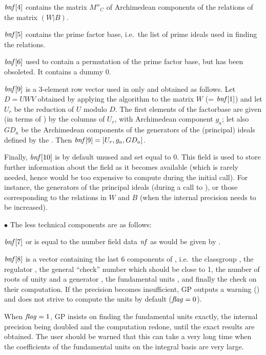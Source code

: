 $\hbox{\it bnf\/}[4]$ contains the matrix $M''_C$ of Archimedean components of the
relations of the matrix $(W|B)$.

$\hbox{\it bnf\/}[5]$ contains the prime factor base, i.e.~the list of prime
ideals used in finding the relations.

$\hbox{\it bnf\/}[6]$ used to contain a permutation of the prime factor base, but
has been obsoleted. It contains a dummy $0$.

$\hbox{\it bnf\/}[9]$ is a 3-element row vector used in  only
and obtained as follows.  Let $D = U W V$ obtained by applying the
 algorithm to the matrix $W$ (= $\hbox{\it bnf\/}[1]$) and
let $U_r$ be the reduction of $U$ modulo $D$. The first elements of the
factorbase are given (in terms of ) by the columns of $U_r$,
with Archimedean component $g_a$; let also $GD_a$ be the Archimedean
components of the generators of the (principal) ideals defined by the
. Then $\hbox{\it bnf\/}[9]=[U_r, g_a, GD_a]$.

Finally, $\hbox{\it bnf\/}[10]$ is by default unused and set equal to 0. This
field is used to store further information about the field as it becomes
available (which is rarely needed, hence would be too expensive to compute
during the initial  call). For instance, the generators of the
principal ideals  (during a call to
), or those corresponding to the relations in $W$ and
$B$ (when the  internal precision needs to be increased).
\smallskip

\noindent$\bullet$ The less technical components are as follows:

$\hbox{\it bnf\/}[7]$ or  is equal to the number field data
$\hbox{\it nf\/}$ as would be given by .

$\hbox{\it bnf\/}[8]$ is a vector containing the last 6 components of
, i.e.~the classgroup , the
regulator , the general ``check'' number which should be
close to 1, the number of roots of unity and a generator ,
the fundamental units , and finally the check on their
computation. If the precision becomes insufficient, GP outputs a warning
() and does not strive to
compute the units by default ($\hbox{\it f\kern0pt lag\/}=0$).

   When $\hbox{\it f\kern0pt lag\/}=1$, GP insists on finding the fundamental units exactly, the
internal precision being doubled and the computation redone, until the exact
results are obtained. The user should be warned that this can take a very
long time when the coefficients of the fundamental units on the integral
basis are very large.

